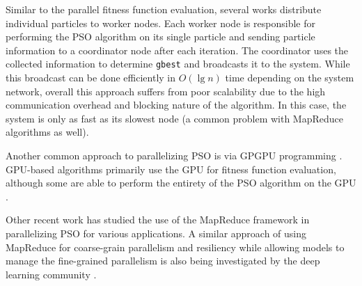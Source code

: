 Similar to the parallel fitness function evaluation, several works
\cite{cooppso, optionpso} distribute individual particles to worker nodes. Each
worker node is responsible for performing the PSO algorithm on its single
particle and sending particle information to a coordinator node after each
iteration. The coordinator uses the collected information to determine
\texttt{gbest} and broadcasts it to the system. While this broadcast can be done
efficiently in $O(\lg n)$ time depending on the system network, overall this
approach suffers from poor scalability due to the high communication overhead
and blocking nature of the algorithm. In this case, the system is only as fast
as its slowest node (a common problem with MapReduce algorithms as well).

Another common approach to parallelizing PSO is via GPGPU programming
\cite{gpu-ppso, gpu-pso, biopsogpu}. GPU-based
algorithms primarily use the GPU for fitness function evaluation, although
some are able to perform the entirety of the PSO algorithm on the GPU
\cite{swarmgrid, multiswarmpso-gpu}.

Other recent work \cite{mrcpso, mprso, coop-pso, intrusion-pso} has
studied the use of the MapReduce framework \cite{mapreduce} in parallelizing PSO
for various applications.
A similar approach of using
MapReduce for coarse-grain parallelism and resiliency while allowing
models to manage the fine-grained
parallelism is also being investigated by the deep learning community \cite{mrpnn,
  heterospark, dlspark}.


